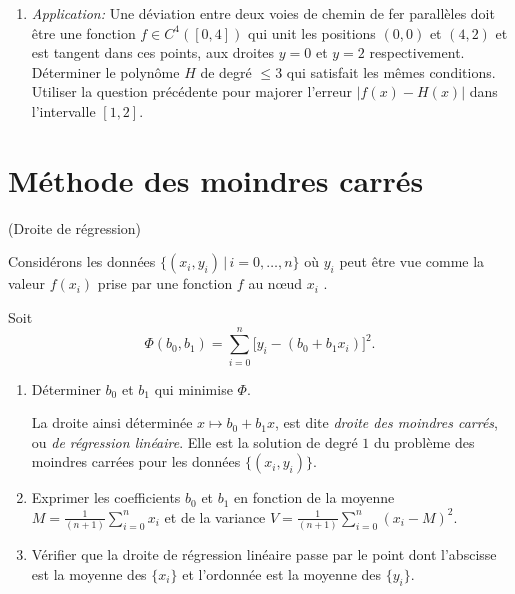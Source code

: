 \documentclass[a4paper,12pt,reqno]{amsart}
\begin{document}
\begin{exo}
\begin{enumerate}
    \item \textit{Application:} Une déviation entre deux voies de chemin de fer parallèles doit être une fonction $f \in C^{4}\left([0,4]\right)$ qui unit les positions $(0,0)$ et $(4,2)$ et est tangent dans ces points, aux droites $y=0$ et $y=2$ respectivement. Déterminer le polynôme $H$ de degré $\leq 3$ qui satisfait les mêmes conditions. Utiliser la question précédente pour majorer l'erreur $|f(x)-H(x)|$ dans l'intervalle $[1,2]$.

  \end{enumerate}
\end{exo}

\section{Méthode des moindres carrés}


\begin{exo} (Droite de régression)

  Considérons les données $\{(x_{i} ,y_{i}) \,|\, i = 0,\ldots,n\}$ où $y_{i}$ peut être vue comme la valeur $f(x_{i})$ prise par une fonction $f$ au nœud $x_{i}$ .

  Soit
    $$
      \Phi(b_{0} ,b_{1}) =
        \sum_{i=0}^{n} \big[y_{i} - (b_{0} + b_{1} x_{i})\big]^{2}.
    $$

  \begin{enumerate}
    \item Déterminer $b_{0}$ et $b_{1}$ qui minimise $\Phi$.

    La droite ainsi déterminée $x \mapsto b_{0} + b_{1} x$, est dite \emph{droite des moindres carrés}, ou \emph{de régression linéaire}. Elle est la solution de degré $1$ du problème des moindres carrées pour les données $\{(x_{i} ,y_{i})\}$.

    \item Exprimer les coefficients $b_{0}$ et $b_{1}$ en fonction de la moyenne $M = \frac1{(n+1)} \sum_{i=0}^{n} x_{i}$  et de la variance $V = \frac1{(n+1)} \sum_{i=0}^{n} (x_{i}-M)^{2}$.
    \item  Vérifier que la droite de régression linéaire passe par le point dont l'abscisse est la moyenne des $\{x_{i}\}$ et l'ordonnée est la moyenne des $\{y_{i}\}$.
  \end{enumerate}


\end{exo}
\end{document}

